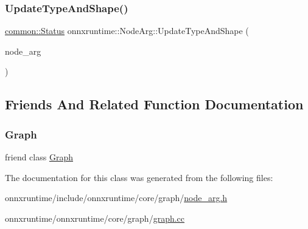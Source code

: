 \mbox{\label{classonnxruntime_1_1NodeArg_aa179dde5962354ac9ae2c62ed674a737}} 
\subsubsection{\texorpdfstring{Update\+Type\+And\+Shape()}{UpdateTypeAndShape()}\hspace{0.1cm}{\footnotesize\ttfamily [2/2]}}
{\footnotesize\ttfamily \mbox{\hyperlink{classonnxruntime_1_1common_1_1Status}{common\+::\+Status}} onnxruntime\+::\+Node\+Arg\+::\+Update\+Type\+And\+Shape (\begin{DoxyParamCaption}\item[{const \mbox{\hyperlink{classonnxruntime_1_1NodeArg}{Node\+Arg}} \&}]{node\+\_\+arg }\end{DoxyParamCaption})}



\subsection{Friends And Related Function Documentation}
\mbox{\label{classonnxruntime_1_1NodeArg_afab89afd724f1b07b1aaad6bdc61c47a}} 
\subsubsection{\texorpdfstring{Graph}{Graph}}
{\footnotesize\ttfamily friend class \mbox{\hyperlink{classonnxruntime_1_1Graph}{Graph}}\hspace{0.3cm}{\ttfamily [friend]}}



The documentation for this class was generated from the following files\+:\begin{DoxyCompactItemize}
\item 
onnxruntime/include/onnxruntime/core/graph/\mbox{\hyperlink{node__arg_8h}{node\+\_\+arg.\+h}}\item 
onnxruntime/onnxruntime/core/graph/\mbox{\hyperlink{graph_8cc}{graph.\+cc}}\end{DoxyCompactItemize}
